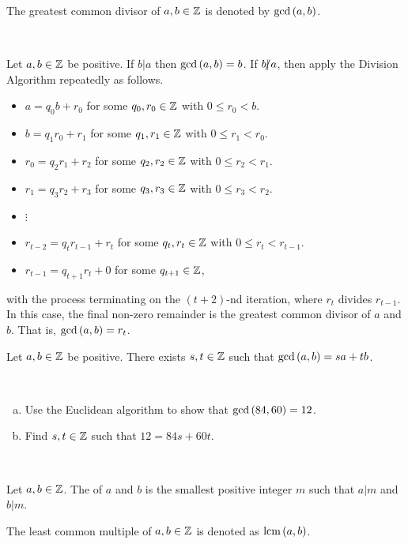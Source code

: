 \documentclass[11pt,fleqn,dvipsnames,usenames]{article}
\begin{document}
\notation The greatest common divisor of $a,b\in\mathbb{Z}$ is denoted by $\text{gcd}\left(a,b\right)$.
\vsp

\begin{example*}~
\vspace{1cm}

\end{example*}
%
\begin{theorem*}
Let $a,b\in\mathbb{Z}$ be positive.  If $b|a$ then $\text{gcd}\left(a,b\right) = b$.  If $b|\kern-0.9ex{/} a$, then apply the Division Algorithm repeatedly as follows.

\begin{itemize}[\ ]
\item $a = q_{0}b + r_{0}$ for some $q_{0},r_{0}\in\mathbb{Z}$ with $0 \leq r_{0} < b$.
\item $b = q_{1}r_{0} + r_{1}$ for some $q_{1},r_{1}\in\mathbb{Z}$ with $0 \leq r_{1} < r_{0}$.
\item $r_{0} = q_{2}r_{1} + r_{2}$ for some $q_{2},r_{2}\in\mathbb{Z}$ with $0 \leq r_{2} < r_{1}$.
\item $r_{1} = q_{3}r_{2} + r_{3}$ for some $q_{3},r_{3}\in\mathbb{Z}$ with $0 \leq r_{3} < r_{2}$.
\item {}$\vdots$
\item $r_{t-2} = q_{t}r_{t-1} + r_{t}$ for some $q_{t},r_{t}\in\mathbb{Z}$ with $0 \leq r_{t} < r_{t-1}$.
\item $r_{t-1} = q_{t+1}r_{t} + 0$ for some $q_{t+1}\in\mathbb{Z}$,
\end{itemize}
with the process terminating on the $(t+2)$-nd iteration, where $r_{t}$ divides $r_{t-1}$.  In this case, the final non-zero remainder is the greatest common divisor of $a$ and $b$.  That is, $\text{gcd}\left(a,b\right) = r_{t}$.
\end{theorem*}
%
\begin{corollary*}\label{bezout}
Let $a,b\in\mathbb{Z}$ be positive.  There exists $s,t\in\mathbb{Z}$ such that $\text{gcd}\left(a,b\right) = sa + tb$.
\end{corollary*}
%
\begin{example*}~
\begin{enumerate}[(a)]
\item Use the Euclidean algorithm to show that $\text{gcd}\left(84,60\right) = 12$.
\item Find $s,t\in\mathbb{Z}$ such that $12 = 84s + 60t$.
\end{enumerate}
\end{example*}
%
\begin{solution}~
\vspace{10cm}

\end{solution}
%
\begin{definition*}
Let $a,b\in\mathbb{Z}$.  The  of $a$ and $b$ is the smallest positive integer $m$ such that $a|m$ and $b|m$.
\end{definition*}
%
\notation The least common multiple of $a,b\in\mathbb{Z}$ is denoted as $\text{lcm}\left(a,b\right)$.
\vsp
\end{document}
